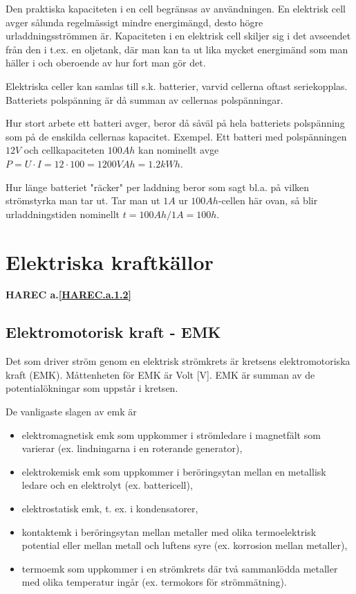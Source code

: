 Den praktiska kapaciteten i en cell begränsas av användningen. En elektrisk cell
avger sålunda regelmässigt mindre energimängd, desto högre urladdningsströmmen
är. Kapaciteten i en elektrisk cell skiljer sig i det avseendet från den i t.ex. en
oljetank, där man kan ta ut lika mycket energimänd som man häller i och oberoende av hur
fort man gör det.


Elektriska celler kan samlas till s.k. batterier, varvid cellerna oftast seriekopplas.
Batteriets polspänning är då summan av cellernas polspänningar.

Hur stort arbete ett batteri avger, beror då såväl på hela batteriets polspänning som på
de enskilda cellernas kapacitet.
Exempel.
Ett batteri med polspänningen $12 V$ och cellkapaciteten $100 Ah$ kan nominellt avge
$P = U \cdot I = 12 \cdot 100 = 1200 VAh = 1.2kWh$.

Hur länge batteriet "räcker" per laddning beror som sagt bl.a. på vilken strömstyrka
man tar ut. Tar man ut $1 A$ ur $100 Ah$-cellen här ovan, så blir urladdningstiden
nominellt $t = 100 Ah/1 A = 100 h$.

\cleardoublepage

\section{Elektriska kraftkällor}
\textbf{HAREC a.\ref{HAREC.a.1.2}\label{myHAREC.a.1.2}}

\subsection{Elektromotorisk kraft - EMK}

Det som driver ström genom en elektrisk strömkrets är kretsens elektromotoriska kraft
(EMK).
Måttenheten för EMK är Volt [V]. EMK är summan av de potentialökningar som uppstår i
kretsen.

De vanligaste slagen av emk är
\begin{itemize}
\item elektromagnetisk emk som uppkommer i
strömledare i magnetfält som varierar
(ex. lindningarna i en roterande generator),
\item elektrokemisk emk som uppkommer i
beröringsytan mellan en metallisk ledare
och en elektrolyt (ex. battericell),
\item elektrostatisk emk, t. ex. i kondensatorer,
\item kontaktemk i beröringsytan mellan metaller med olika termoelektrisk potential
eller mellan metall och luftens syre (ex.
korrosion mellan metaller),
\item termoemk som uppkommer i en strömkrets där två sammanlödda metaller med
olika temperatur ingår (ex. termokors för
strömmätning).
\end{itemize}

